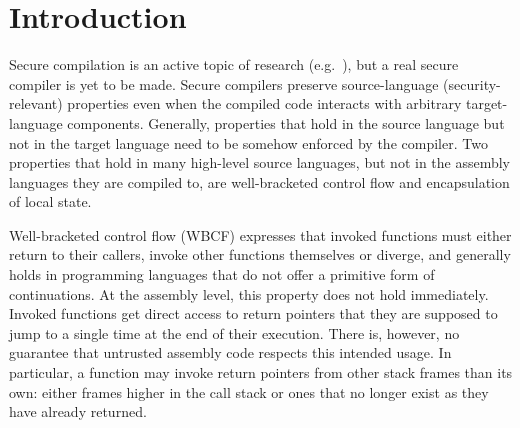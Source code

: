 \documentclass[acmsmall,review,showframe]{acmart}\settopmatter{printfolios=true,printccs=false,printacmref=false}
\begin{document}




\maketitle


\section{Introduction}
\label{sec:introduction}
Secure compilation is an active topic of research (e.g.~\citep{devriese_modular_2017,patrignani_hyper_2017,abate_good_components_2018,new_universal_embedding_2016,juglaret_beyond_2016}), but a real secure compiler is yet to be made.
Secure compilers preserve source-language (security-relevant) properties even when the compiled code interacts with arbitrary target-language components.
Generally, properties that hold in the source language but not in the target language need to be somehow enforced by the compiler.
Two properties that hold in many high-level source languages, but not in the assembly languages they are compiled to, are well-bracketed control flow and encapsulation of local state.

Well-bracketed control flow (WBCF) expresses that invoked functions must either return to their callers, invoke other functions themselves or diverge, and generally holds in programming languages that do not offer a primitive form of continuations. 
At the assembly level, this property does not hold immediately. 
Invoked functions get direct access to return pointers that they are supposed to jump to a single time at the end of their execution.
There is, however, no guarantee that untrusted assembly code respects this intended usage.
In particular, a function may invoke return pointers from other stack frames than its own: either frames higher in the call stack or ones that no longer exist as they have already returned. 
\end{document}
